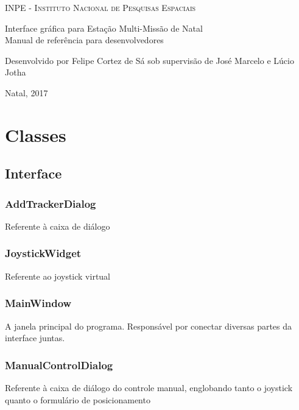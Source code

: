 \documentclass[12pt, a4paper]{article}
\begin{document}
\begin{titlepage}
\begin{center}
    \textsc{INPE - Instituto Nacional de Pesquisas Espaciais}

    \vfill

    Interface gráfica para Estação Multi-Missão de Natal \\
    Manual de referência para desenvolvedores

    \vfill

    \begin{flushright}
    Desenvolvido por Felipe Cortez de Sá sob supervisão de José Marcelo e Lúcio Jotha
    \end{flushright}

    \vfill
    Natal, 2017
\end{center}
\end{titlepage}

\tableofcontents

\newpage

\section{Classes}
\subsection{Interface}
\subsubsection{AddTrackerDialog}
Referente à caixa de diálogo

\subsubsection{JoystickWidget}
Referente ao joystick virtual

\subsubsection{MainWindow}
A janela principal do programa. Responsável por conectar diversas partes da
interface juntas.

\subsubsection{ManualControlDialog}
Referente à caixa de diálogo do controle manual, englobando tanto o joystick
quanto o formulário de posicionamento
\end{document}
